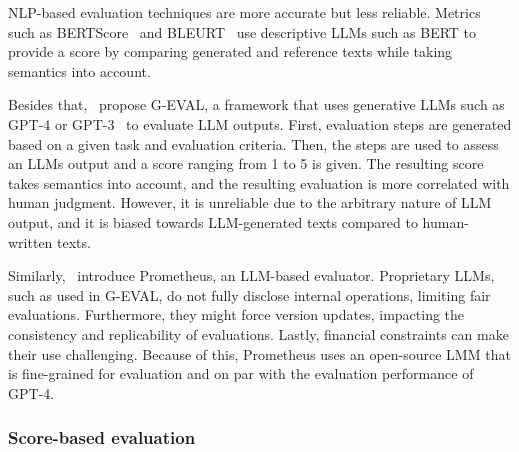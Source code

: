 NLP-based evaluation techniques are more accurate but less reliable.
Metrics such as BERTScore\ \citep{zhang2019bertscore} and BLEURT\ \citep{sellam2020bleurt} use descriptive LLMs such as
BERT to provide a score by comparing generated and reference texts while taking semantics into account.

Besides that,\ \citet{liu2023gpteval} propose G-EVAL, a framework that uses generative LLMs such as GPT-4 or
GPT-3\ \citep{brown2020language} to evaluate LLM outputs.
First, evaluation steps are generated based on a given task and evaluation criteria.
Then, the steps are used to assess an LLMs output and a score ranging from 1 to 5 is given.
The resulting score takes semantics into account, and the resulting evaluation is more correlated with human judgment.
However, it is unreliable due to the arbitrary nature of LLM output, and it is biased towards LLM-generated texts
compared to human-written texts.

Similarly,\ \citet{kim2023prometheus} introduce Prometheus, an LLM-based evaluator.
Proprietary LLMs, such as used in G-EVAL, do not fully disclose internal operations, limiting fair evaluations.
Furthermore, they might force version updates, impacting the consistency and replicability of evaluations.
Lastly, financial constraints can make their use challenging.
Because of this, Prometheus uses an open-source LMM that is fine-grained for evaluation and on par with the evaluation
performance of GPT-4.

\subsubsection{Score-based evaluation}

